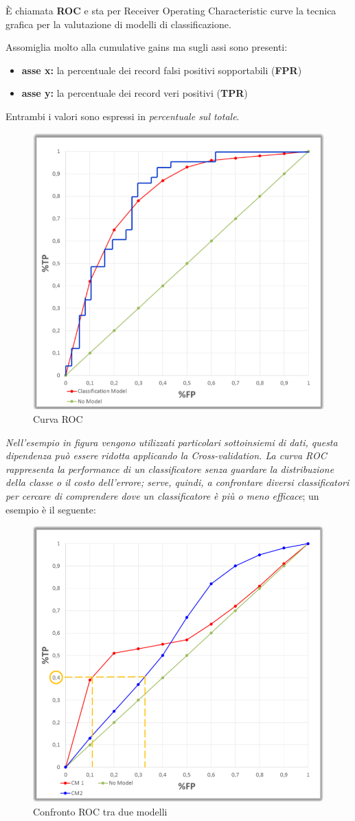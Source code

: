 \begin{defn}
	\`E chiamata \textbf{ROC} e sta per Receiver Operating Characteristic curve la tecnica grafica per la valutazione di modelli di classificazione.
\end{defn} 
Assomiglia molto alla cumulative gains ma sugli assi sono presenti:
\begin{itemize}
	\item \textbf{asse x:} la percentuale dei record falsi positivi sopportabili (\textbf{FPR})
	\item \textbf{asse y:} la percentuale dei record veri positivi (\textbf{TPR})
\end{itemize}
Entrambi i valori sono espressi in \textit{percentuale sul totale}. 
\begin{figure}[H]
	\centering
	\includegraphics[height=0.6 \linewidth]{classification/pict/roc.png}
	\caption{Curva ROC}
\end{figure}
\textit{Nell'esempio in figura vengono utilizzati particolari sottoinsiemi di dati, questa dipendenza può essere ridotta applicando la Cross-validation. La curva ROC rappresenta la performance di un classificatore senza guardare la distribuzione della classe o il costo dell'errore; serve, quindi, a confrontare diversi classificatori per cercare di comprendere dove un classificatore \`e pi\`u o meno efficace}; un esempio è il seguente:

\begin{figure}[H]
	\centering
	\includegraphics[height=0.6 \linewidth]{classification/pict/roc_confronto.png}
	\caption{Confronto ROC tra due modelli}
\end{figure}

